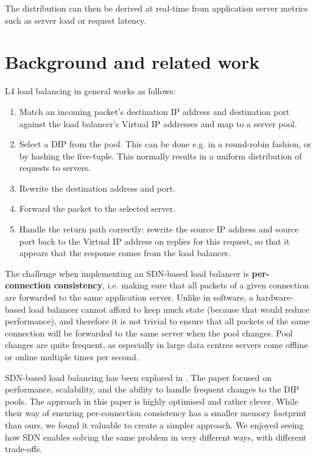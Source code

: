 \documentclass[11pt,oneside,a4paper]{article}
\begin{document}
The distribution can then be derived at real-time from application server
metrics such as server load or request latency.

\section{Background and related work}
L4 load balancing in general works as follows:

\begin{enumerate}
\item Match an incoming packet's destination IP address and destination port
    against the load balancer's Virtual IP addresses and map to a server pool.
\item Select a DIP from the pool.
    This can be done e.g. in a round-robin fashion, or by hashing the five-tuple.
    This normally results in a uniform distribution of requests to servers.
\item Rewrite the destination address and port.
\item Forward the packet to the selected server.
\item Handle the return path correctly: rewrite the source IP address and source
    port back to the Virtual IP address on replies for this request, so that
    it appears that the response comes from the load balancer.
\end{enumerate}

The challenge when implementing an SDN-based load balancer is
\textbf{per-connection consistency}, i.e. making sure that all packets of a
given connection are forwarded to the same application server.
Unlike in software, a hardware-based load balancer cannot afford to keep much
state (because that would reduce performance), and therefore it is not trivial
to ensure that all packets of the same connection will be forwarded to the same
server when the pool changes.
Pool changes are quite frequent, as especially in large data centres servers
come offline or online multiple times per second.\cite{googleinfra}

SDN-based load balancing has been explored in \cite{silkroad}.
The paper focused on performance, scalability, and the ability to handle
frequent changes to the DIP pools.
The approach in this paper is highly optimised and rather clever.
While their way of ensuring per-connection consistency has a smaller memory
footprint than ours, we found it valuable to create a simpler approach.
We enjoyed seeing how SDN enables solving the same problem in very different
ways, with different trade-offs.
\end{document}

